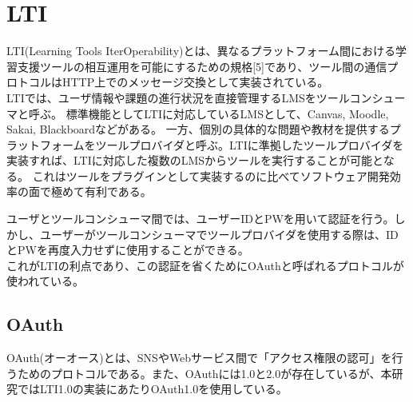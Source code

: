 \section{LTI}\label{tag:LTI}
LTI(Learning Tools IterOperability)とは、異なるプラットフォーム間における学習支援ツールの相互運用を可能にするための規格[5]であり、ツール間の通信プロトコルはHTTP上でのメッセージ交換として実装されている。\\

LTIでは、ユーザ情報や課題の進行状況を直接管理するLMSをツールコンシューマと呼ぶ。
標準機能としてLTIに対応しているLMSとして、Canvas, Moodle, Sakai, Blackboardなどがある。
一方、個別の具体的な問題や教材を提供するプラットフォームをツールプロバイダと呼ぶ。LTIに準拠したツールプロバイダを実装すれば、LTIに対応した複数のLMSからツールを実行することが可能となる。
これはツールをプラグインとして実装するのに比べてソフトウェア開発効率の面で極めて有利である。
%

ユーザとツールコンシューマ間では、ユーザーIDとPWを用いて認証を行う。しかし、ユーザーがツールコンシューマでツールプロバイダを使用する際は、IDとPWを再度入力せずに使用することができる。\\
これがLTIの利点であり、この認証を省くためにOAuthと呼ばれるプロトコルが使われている。
\subsection{OAuth}
OAuth(オーオース)とは、SNSやWebサービス間で「アクセス権限の認可」を行うためのプロトコルである。また、OAuthには1.0と2.0が存在しているが、本研究ではLTI1.0の実装にあたりOAuth1.0を使用している。

